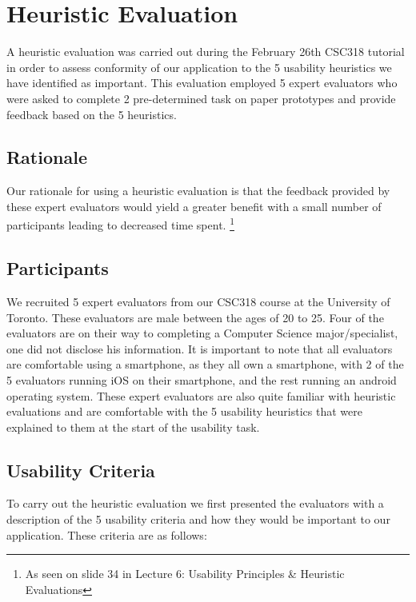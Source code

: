 \documentclass[pdftex,12pt,a4paper]{report}
\begin{document}

\tableofcontents

\chapter{Heuristic Evaluation}
A heuristic evaluation was carried out during the February 26th CSC318 tutorial in order to assess conformity of our application to the 5 usability heuristics we have identified as important. This evaluation employed 5 expert evaluators who were asked to complete 2 pre-determined task on paper prototypes and provide feedback based on the 5 heuristics.

\section{Rationale}
Our rationale for using a heuristic evaluation is that the feedback provided by these expert evaluators would yield a greater benefit with a small number of participants leading to decreased time spent. \footnote{As seen on slide 34 in Lecture 6: Usability Principles \& Heuristic Evaluations}

\section{Participants}
We recruited 5 expert evaluators from our CSC318 course at the University of Toronto. These evaluators are male between the ages of 20 to 25. Four of the evaluators are on their way to completing a Computer Science major/specialist, one did not disclose his information. It is important to note that all evaluators are comfortable using a smartphone, as they all own a smartphone, with 2 of the 5 evaluators running iOS on their smartphone, and the rest running an android operating system. These expert evaluators are also quite familiar with heuristic evaluations and are comfortable with the 5 usability heuristics that were explained to them at the start of the usability task.

\section{Usability Criteria}

To carry out the heuristic evaluation we first presented the evaluators with a description of the 5 usability criteria and how they would be important to our application. These criteria are as follows:
\vspace{0.7cm}
\end{document}
